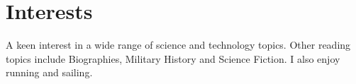 
\section{Interests}

A keen interest in a wide range of science and technology topics. 
Other reading topics include Biographies, Military History 
and Science Fiction. I also enjoy running and sailing. 

\closesection{}
